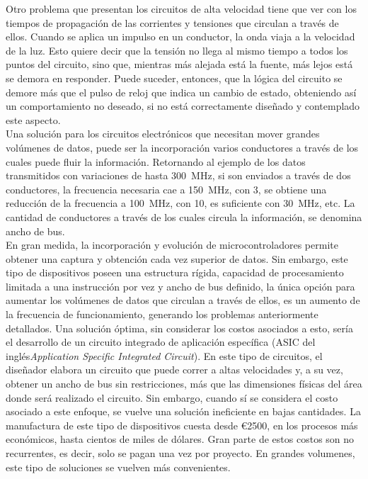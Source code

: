 Otro problema que presentan los circuitos de alta velocidad tiene que ver con los tiempos de propagación de las corrientes y tensiones que circulan a través de ellos. Cuando se aplica un impulso en un conductor, la onda viaja a la velocidad de la luz. Esto quiere decir que la tensión no llega al mismo tiempo a todos los puntos del circuito, sino que, mientras más alejada está la fuente, más lejos está se demora en responder. Puede suceder, entonces, que la lógica del circuito se demore más que el pulso de reloj que indica un cambio de estado, obteniendo así un comportamiento no deseado, si no está correctamente diseñado y contemplado este aspecto.\\

Una solución para los circuitos electrónicos que necesitan mover grandes volúmenes de datos, puede ser la incorporación varios conductores a través de los cuales puede fluir la información. Retornando al ejemplo de los datos transmitidos con variaciones de hasta \SI{300}{\mega\hertz}, si son enviados a través de dos conductores, la frecuencia necesaria cae a \SI{150}{\mega\hertz}, con 3, se obtiene una reducción de la frecuencia a \SI{100}{\mega\hertz}, con 10, es suficiente con \SI{30}{\mega\hertz}, etc. La cantidad de conductores a través de los cuales circula la información, se denomina ancho de bus.\\

En gran medida, la incorporación y evolución de microcontroladores permite obtener una captura y obtención cada vez superior de datos. Sin embargo, este tipo de dispositivos poseen una estructura rígida, capacidad de procesamiento limitada a una instrucción por vez y ancho de bus definido, la única opción para aumentar los volúmenes de datos que circulan a través de ellos, es un aumento de la frecuencia de funcionamiento, generando los problemas anteriormente detallados. Una solución óptima, sin considerar los costos asociados a esto, sería el desarrollo de un circuito integrado de aplicación específica (ASIC del inglés{\it Application Specific Integrated Circuit}). En este tipo de circuitos, el diseñador elabora un circuito que puede correr a altas velocidades y, a su vez, obtener un ancho de bus sin restricciones, más que las dimensiones físicas del área donde será realizado el circuito. Sin embargo, cuando sí se considera el costo asociado a este enfoque, se vuelve una solución ineficiente en bajas cantidades. La manufactura de este tipo de dispositivos cuesta desde €2500, en los procesos más económicos, hasta cientos de miles de dólares. Gran parte de estos costos son no recurrentes, es decir, solo se pagan una vez por proyecto. En grandes volumenes, este tipo de soluciones se vuelven más convenientes.\\

